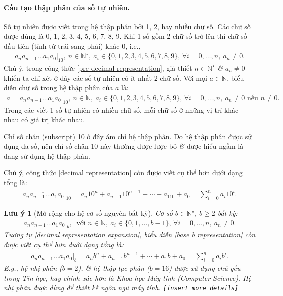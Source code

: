 \documentclass{article}
\numberwithin{equation}{section}
\newtheorem{remark}{Lưu ý}[section]
\begin{document}
\paragraph{Cấu tạo thập phân của số tự nhiên.} Số tự nhiên được viết trong hệ thập phân bởi 1, 2, hay nhiều chữ số. Các chữ số được dùng là 0, 1, 2, 3, 4, 5, 6, 7, 8, 9. Khi 1 số gồm 2 chữ số trở lên thì chữ số đầu tiên (tính từ trái sang phải) khác 0, i.e.,
\begin{align}
	\label{pre-decimal representation}
	\overline{a_na_{n-1}\ldots a_1a_0}|_{10},\ n\in\mathbb{N}^\star,\ a_i\in\{0,1,2,3,4,5,6,7,8,9\},\,\forall i = 0,\ldots,n,\ a_n\ne 0.
\end{align}
Chú ý, trong công thức \eqref{pre-decimal representation}, giả thiết $n\in\mathbb{N}^\star$ \textit{\&} $a_n\ne 0$ khiến ta chỉ xét ở đây các số tự nhiên có ít nhất 2 chữ số. Với mọi $a\in\mathbb{N}$, biểu diễn chữ số trong hệ thập phân của $a$ là:
\begin{align}
	\label{decimal representation}
	a = \overline{a_na_{n-1}\ldots a_1a_0}|_{10},\ n\in\mathbb{N},\ a_i\in\{0,1,2,3,4,5,6,7,8,9\},\,\forall i = 0,\ldots,n,\ a_n\ne 0\mbox{ nếu } n\ne 0.
\end{align}
Trong các viết 1 số tự nhiên có nhiều chữ số, mỗi chữ số ở những vị trí khác nhau có giá trị khác nhau.

Chỉ số chân (subscript) 10 ở đây ám chỉ hệ thập phân. Do hệ thập phân được sử dụng đa số, nên chỉ số chân 10 này thường được lược bỏ \textit{\&} được hiểu ngầm là đang sử dụng hệ thập phân.

Chú ý, công thức \eqref{decimal representation} còn được viết cụ thể hơn dưới dạng tổng là:
\begin{align}
	\label{decimal representation expansion}
	\overline{a_na_{n-1}\ldots a_1a_0}|_{10} = a_n10^n + a_{n-1}10^{n-1} + \cdots + a_110 + a_0 = \sum_{i=0}^n a_i10^i.
\end{align}

\begin{remark}[Mở rộng cho hệ cơ số nguyên bất kỳ]
	Cơ số $b\in\mathbb{N}^\star$, $b\ge 2$ bất kỳ:
	\begin{align}
		\label{base b representation}
		\overline{a_na_{n-1}\ldots a_1a_0}|_{b},\ \mbox{ với } n\in\mathbb{N},\ a_i\in\{0,1,\ldots,b - 1\},\,\forall i = 0,\ldots,n,\ a_n\ne 0.
	\end{align}
	Tương tự \eqref{decimal representation expansion}, biểu diễn \eqref{base b representation} còn được viết cụ thể hơn dưới dạng tổng là:
	\begin{align}
		\label{base b representation expansion}
		\overline{a_na_{n-1}\ldots a_1a_0}|_{b} = a_nb^n + a_{n-1}b^{n-1} + \cdots + a_1b + a_0 = \sum_{i=0}^n a_ib^i.
	\end{align}
	E.g., hệ nhị phân ($b = 2$), \textit{\&} hệ thập lục phân ($b = 16$) được xử dụng chủ yếu trong Tin học, hay chính xác hơn là Khoa học Máy tính (Computer Science). Hệ nhị phân được dùng để thiết kế ngôn ngữ máy tính. \texttt{[insert more details]}
\end{remark}
\end{document}

